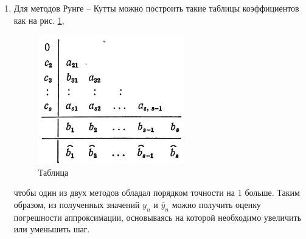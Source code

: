\documentclass[12pt, a4paper]{article}
\begin{document}
\begin{enumerate}
\begin{enumerate}
			\item Для методов Рунге -- Кутты можно построить такие таблицы коэффициентов как на рис. \ref{fig:Special-Butcher}, 
			\begin{figure}[h]
				\centering
				\includegraphics[width=0.6\textwidth]{butcher_table_sp}
				\caption{Таблица }
				\label{fig:Special-Butcher}
			\end{figure}
			 чтобы один из двух методов обладал порядком точности на 1 больше. Таким образом, из полученных значений $y_n$ и $\tilde{y_n}$ можно получить оценку погрешности аппроксимации, основываясь на которой необходимо увеличить или уменьшить шаг.
		\end{enumerate}
		
	\end{enumerate}

	
	
	
	
\end{document}
